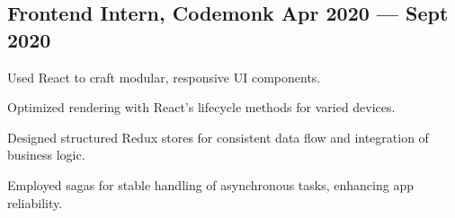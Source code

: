 \subsection{{Frontend Intern, Codemonk \hfill Apr 2020 --- Sept 2020}}
\begin{zitemize}
\item Used React to craft modular, responsive UI components. 
\item Optimized rendering with React's lifecycle methods for varied devices.
\item Designed structured Redux stores for consistent data flow and integration of business logic.
\item Employed sagas for stable handling of asynchronous tasks, enhancing app reliability.
\end{zitemize}




